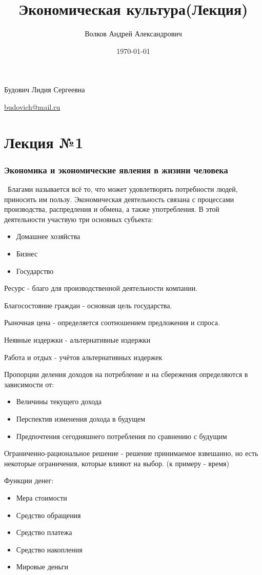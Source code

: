 \documentclass[a4paper, 12pt]{article}
\author{Волков Андрей Александрович}
\title{Экономическая культура(Лекция)}
\date{\today}
\begin{document}
	\maketitle
	Будович Лидия Сергеевна
	
	\href{budovich@mail.ru}{budovich@mail.ru}
	
	\part*{Лекция №1}
	
	\section{Экономика и экономические явления в жизини человека}
	
	\quad \, Благами называется всё то, что может удовлетворять потребности людей, приносить им пользу. Экономическая деятельность связана с процессами производства, распредления и обмена, а также употребления. В этой деятельности участвую три основных субъекта:
	\begin{itemize}
		\item Домашнее хозяйства
		\item Бизнес
		\item Государство
	\end{itemize}

	Ресурс - благо для производственной деятельности компании.
	
	Благосостояние граждан - основная цель государства.
	
	Рыночная цена - определяется соотношением предложения и спроса.
	
	Неявные издержки - альтернативные издержки
	
	Работа и отдых - учётов альтернативных издержек
	
	Пропорции деления доходов на потребление и на сбережения определяются в зависимости от:
	\begin{itemize}
		\item Величины текущего дохода
		\item Перспектив изменения дохода в будущем
		\item Предпочтения сегодняшнего потребления по сравнению с будущим
	\end{itemize}

	Ограниченно-рациональное решение - решение принимаемое взвешанно, но есть некоторые ограничения, которые влияют на выбор. (к примеру - время)


	Функции денег:
	\begin{itemize}
		\item Мера стоимости
		\item Средство обращения
		\item Средство платежа
		\item Средство накопления
		\item Мировые деньги
	\end{itemize}
\end{document}

